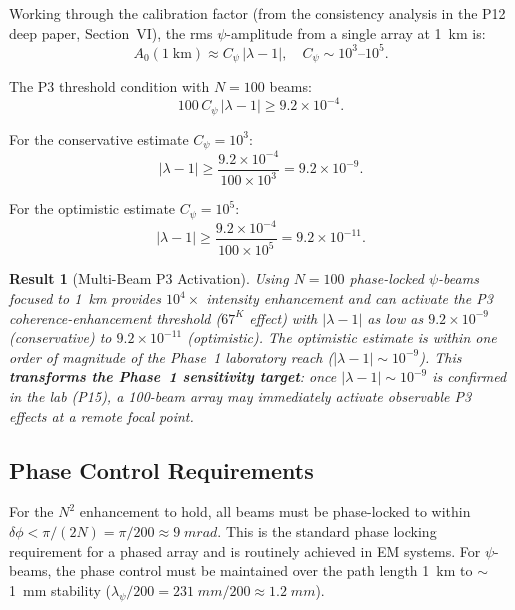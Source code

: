 \documentclass[aps,prd,twocolumn,superscriptaddress]{revtex4-2}
\newtheorem{result}{Result}
\begin{document}
Working through the calibration factor (from the consistency analysis
in the P12 deep paper, Section~VI), the rms $\psi$-amplitude from a
single array at 1~km is:
\begin{equation}
A_0(1\;\text{km}) \approx C_\psi\,|\lambda-1|,
\quad C_\psi \sim 10^3\text{--}10^5.
\label{eq:A0}
\end{equation}

The P3 threshold condition with $N = 100$ beams:
\begin{equation}
100\,C_\psi\,|\lambda-1| \geq 9.2\times10^{-4}.
\end{equation}

For the conservative estimate $C_\psi = 10^3$:
\begin{equation}
|\lambda-1| \geq \frac{9.2\times10^{-4}}{100\times10^3} = 9.2\times10^{-9}.
\label{eq:lambda-p3}
\end{equation}

For the optimistic estimate $C_\psi = 10^5$:
\begin{equation}
|\lambda-1| \geq \frac{9.2\times10^{-4}}{100\times10^5} = 9.2\times10^{-11}.
\label{eq:lambda-p3-opt}
\end{equation}

\begin{result}[Multi-Beam P3 Activation]
Using $N = 100$ phase-locked $\psi$-beams focused to 1~km provides
$10^4\times$ intensity enhancement and can activate the P3
coherence-enhancement threshold ($67^K$ effect) with
$|\lambda-1|$ as low as $9.2\times10^{-9}$ (conservative) to
$9.2\times10^{-11}$ (optimistic).  The optimistic estimate is
within one order of magnitude of the Phase~1 laboratory reach
($|\lambda-1| \sim 10^{-9}$).  This \textbf{transforms the Phase~1
sensitivity target}: once $|\lambda-1| \sim 10^{-9}$ is confirmed
in the lab (P15), a 100-beam array may immediately activate
observable P3 effects at a remote focal point.
\end{result}

\subsection{Phase Control Requirements}

For the $N^2$ enhancement to hold, all beams must be phase-locked to
within $\delta\phi < \pi/(2N) = \pi/200 \approx 9\;\si{mrad}$.  This
is the standard phase locking requirement for a phased array and is
routinely achieved in EM systems.  For $\psi$-beams, the phase control
must be maintained over the path length 1~km to $\sim$1~mm stability
($\lambda_\psi/200 = 231\;\si{mm}/200 \approx 1.2\;\si{mm}$).
\end{document}
